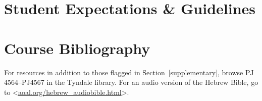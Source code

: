 \documentclass[titlepage]{article}
\newcommand\policy{../policy}
\begin{document}




\section{Student Expectations \& Guidelines}
\label{expectations}







\section{Course Bibliography}
\label{bibliography}

For resources in addition to those flagged in Section~\ref{supplementary},
browse PJ 4564--PJ4567 in the Tyndale library. For an audio version of the
Hebrew Bible, go to <\href{http://aoal.org/hebrew_audiobible.html}{aoal.org/hebrew\_audiobible.html}>.
\end{document}
